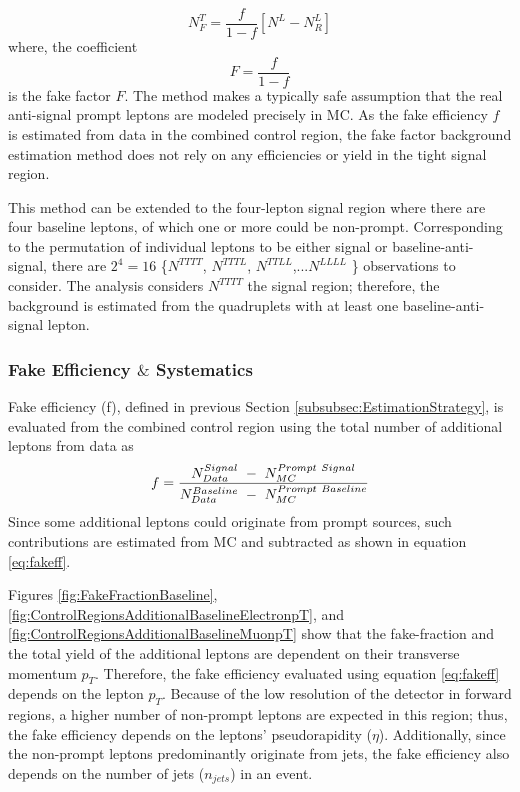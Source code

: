 \begin{equation}
    N_{F}^{T} =  \frac{f}{1-f}[N^{L}-N^{L}_{R}]
\label{eqn:NfakeSignalFinal}
\end{equation}
where, the coefficient \begin{equation} F=\frac{f}{1-f} \label{eqn:FakeFactor}
\end{equation} is the fake factor $F$. The method makes a typically safe assumption that the real anti-signal prompt leptons are modeled precisely in MC. As the fake efficiency $f$ is estimated from data in the combined control region, the fake factor background estimation method does not rely on any efficiencies or yield in the tight signal region.

This method can be extended to the four-lepton signal region where there are four baseline leptons, of which one or more could be non-prompt. Corresponding to the permutation of individual leptons to be either signal or baseline-anti-signal, there are $2^{4}=16$ \{$N^{TTTT}$, $N^{TTTL}$, $N^{TTLL}$,...$N^{LLLL}$ \} observations to consider. The analysis considers $N^{TTTT}$ the signal region; therefore, the background is estimated from the quadruplets with at least one baseline-anti-signal lepton.

\subsubsection{Fake Efficiency $\&$ Systematics}
\label{subsubsec:FakeEff}
Fake efficiency (f), defined in previous Section \ref{subsubsec:EstimationStrategy}, is evaluated from the combined control region using the total number of additional leptons from data as
\begin{equation}{\label{eq:fakeff}}
\begin{aligned}
f = \frac{ N_{Data}^{Signal}~-~N_{MC}^{Prompt~Signal}}{ N_{Data}^{Baseline}~-~N_{MC}^{Prompt~Baseline}}
\end{aligned}
\end{equation}
Since some additional leptons could originate from prompt sources, such contributions are estimated from MC and subtracted as shown in equation \ref{eq:fakeff}.

Figures \ref{fig:FakeFractionBaseline}, \ref{fig:ControlRegionsAdditionalBaselineElectronpT}, and \ref{fig:ControlRegionsAdditionalBaselineMuonpT} show that the fake-fraction and the total yield of the additional leptons are dependent on their transverse momentum $p_{T}$. Therefore, the fake efficiency evaluated using equation \ref{eq:fakeff} depends on the lepton $p_{T}$. Because of the low resolution of the detector in forward regions, a higher number of non-prompt leptons are expected in this region; thus, the fake efficiency depends on the leptons' pseudorapidity ($\eta$). Additionally, since the non-prompt leptons predominantly originate from jets, the fake efficiency also depends on the number of jets ($n_{jets}$) in an event. 

